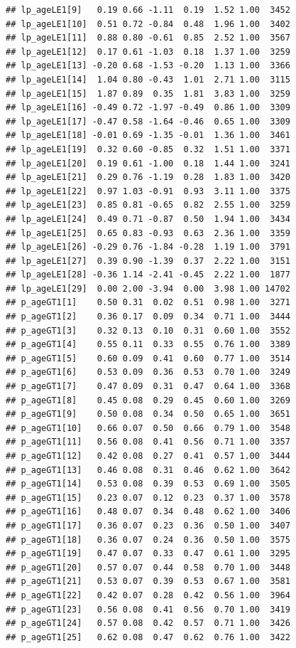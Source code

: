 \documentclass[
  12pt,
]{krantz}
\begin{document}
\begin{verbatim}
## lp_ageLE1[9]   0.19 0.66 -1.11  0.19  1.52 1.00  3452
## lp_ageLE1[10]  0.51 0.72 -0.84  0.48  1.96 1.00  3402
## lp_ageLE1[11]  0.88 0.80 -0.61  0.85  2.52 1.00  3567
## lp_ageLE1[12]  0.17 0.61 -1.03  0.18  1.37 1.00  3259
## lp_ageLE1[13] -0.20 0.68 -1.53 -0.20  1.13 1.00  3366
## lp_ageLE1[14]  1.04 0.80 -0.43  1.01  2.71 1.00  3115
## lp_ageLE1[15]  1.87 0.89  0.35  1.81  3.83 1.00  3259
## lp_ageLE1[16] -0.49 0.72 -1.97 -0.49  0.86 1.00  3309
## lp_ageLE1[17] -0.47 0.58 -1.64 -0.46  0.65 1.00  3309
## lp_ageLE1[18] -0.01 0.69 -1.35 -0.01  1.36 1.00  3461
## lp_ageLE1[19]  0.32 0.60 -0.85  0.32  1.51 1.00  3371
## lp_ageLE1[20]  0.19 0.61 -1.00  0.18  1.44 1.00  3241
## lp_ageLE1[21]  0.29 0.76 -1.19  0.28  1.83 1.00  3420
## lp_ageLE1[22]  0.97 1.03 -0.91  0.93  3.11 1.00  3375
## lp_ageLE1[23]  0.85 0.81 -0.65  0.82  2.55 1.00  3259
## lp_ageLE1[24]  0.49 0.71 -0.87  0.50  1.94 1.00  3434
## lp_ageLE1[25]  0.65 0.83 -0.93  0.63  2.36 1.00  3359
## lp_ageLE1[26] -0.29 0.76 -1.84 -0.28  1.19 1.00  3791
## lp_ageLE1[27]  0.39 0.90 -1.39  0.37  2.22 1.00  3151
## lp_ageLE1[28] -0.36 1.14 -2.41 -0.45  2.22 1.00  1877
## lp_ageLE1[29]  0.00 2.00 -3.94  0.00  3.98 1.00 14702
## p_ageGT1[1]    0.50 0.31  0.02  0.51  0.98 1.00  3271
## p_ageGT1[2]    0.36 0.17  0.09  0.34  0.71 1.00  3444
## p_ageGT1[3]    0.32 0.13  0.10  0.31  0.60 1.00  3552
## p_ageGT1[4]    0.55 0.11  0.33  0.55  0.76 1.00  3389
## p_ageGT1[5]    0.60 0.09  0.41  0.60  0.77 1.00  3514
## p_ageGT1[6]    0.53 0.09  0.36  0.53  0.70 1.00  3249
## p_ageGT1[7]    0.47 0.09  0.31  0.47  0.64 1.00  3368
## p_ageGT1[8]    0.45 0.08  0.29  0.45  0.60 1.00  3269
## p_ageGT1[9]    0.50 0.08  0.34  0.50  0.65 1.00  3651
## p_ageGT1[10]   0.66 0.07  0.50  0.66  0.79 1.00  3548
## p_ageGT1[11]   0.56 0.08  0.41  0.56  0.71 1.00  3357
## p_ageGT1[12]   0.42 0.08  0.27  0.41  0.57 1.00  3444
## p_ageGT1[13]   0.46 0.08  0.31  0.46  0.62 1.00  3642
## p_ageGT1[14]   0.53 0.08  0.39  0.53  0.69 1.00  3505
## p_ageGT1[15]   0.23 0.07  0.12  0.23  0.37 1.00  3578
## p_ageGT1[16]   0.48 0.07  0.34  0.48  0.62 1.00  3406
## p_ageGT1[17]   0.36 0.07  0.23  0.36  0.50 1.00  3407
## p_ageGT1[18]   0.36 0.07  0.24  0.36  0.50 1.00  3575
## p_ageGT1[19]   0.47 0.07  0.33  0.47  0.61 1.00  3295
## p_ageGT1[20]   0.57 0.07  0.44  0.58  0.70 1.00  3448
## p_ageGT1[21]   0.53 0.07  0.39  0.53  0.67 1.00  3581
## p_ageGT1[22]   0.42 0.07  0.28  0.42  0.56 1.00  3964
## p_ageGT1[23]   0.56 0.08  0.41  0.56  0.70 1.00  3419
## p_ageGT1[24]   0.57 0.08  0.42  0.57  0.71 1.00  3426
## p_ageGT1[25]   0.62 0.08  0.47  0.62  0.76 1.00  3422

\end{verbatim}
\end{document}
